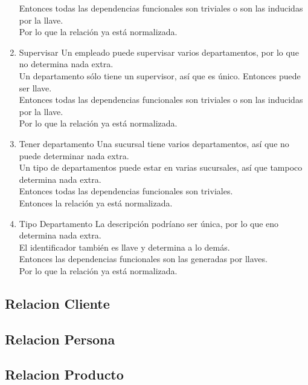 \documentclass[10pt]{article}
\begin{document}
\begin{enumerate}
	Entonces todas las dependencias funcionales son triviales o son las
	inducidas por la llave.\\
	Por lo que la relación ya está normalizada.
	\item Supervisar
	Un empleado puede supervisar varios departamentos, por lo que no determina nada
	extra.\\
	Un departamento sólo tiene un supervisor, así que es único. Entonces puede ser
	llave.\\
	Entonces todas las dependencias funcionales son triviales o son las
	inducidas por la llave.\\
	Por lo que la relación ya está normalizada.
	\item Tener departamento
	Una sucursal tiene varios departamentos, así que no puede determinar nada
	extra.\\
	Un tipo de departamentos puede estar en varias sucursales, así que tampoco
	determina nada extra.\\
	Entonces todas las dependencias funcionales son triviales.\\
	Entonces la relación ya está normalizada.
	\item Tipo Departamento
	La descripción podríano ser única, por lo que eno determina nada extra.\\
	El identificador también es llave y determina a lo demás.\\
	Entonces las dependencias funcionales son las generadas por llaves. \\
	Por lo que la relación ya está normalizada.
\end{enumerate}


 
\subsection{Relacion Cliente}
\subsection{Relacion Persona}

\subsection{Relacion Producto}

\end{document}
